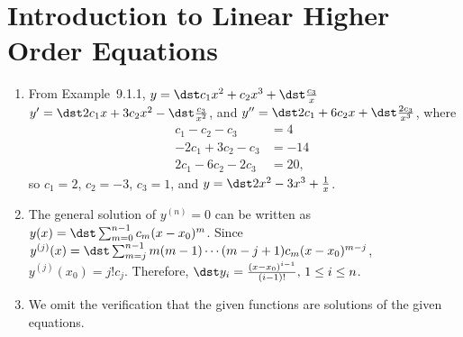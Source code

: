 \documentclass[openany]{book}
\newenvironment{sectionSolutions}{
 \begin{enumerate}[item-label={\thesection.\arabic{enumi}.}]
}{
 \end{enumerate}
}
\begin{document}
\section{Introduction to Linear Higher Order Equations}
\begin{sectionSolutions}
\item From Example~9.1.1,
$y=\dst c_1x^2+c_2x^3+\dst\frac{c_3}{ x}$
$y'=\dst2c_1x+3c_2x^2-\dst\frac{c_3}{ x^2}$, and
$y''=\dst2c_1+6c_2x+\dst\frac{2c_3}{ x^3}$, where
\begin{align*}
c_1-c_2-c_3&=4\phantom{,}\\
-2c_1+3c_2-c_3&=-14\phantom{,}\\
2c_1-6c_2-2c_3&=20,
\end{align*}
so $c_1=2$, $c_2=-3$, $c_3=1$, and
$y=\dst2x^2-3x^3+\frac{1}{ x}$.

\item The general solution of $y^{(n)}=0$
can be written as $y(x)=\dst\sum_{m=0}^{n-1}c_m(x-x_0)^m$. Since
$y^{(j)}(x)=\dst\sum_{m=j}^{n-1}m(m-1)\cdots(m-j+1)c_m(x-x_0)^{m-j}$,
$y^{(j)}(x_0)=j!c_j$. Therefore,
$\dst y_i=\frac{(x-x_0)^{i-1}}{(i-1)!},\,1\le i
\le n$.


\item
We omit the verification that the given functions are solutions of the
given equations.

\end{sectionSolutions}
\end{document}
